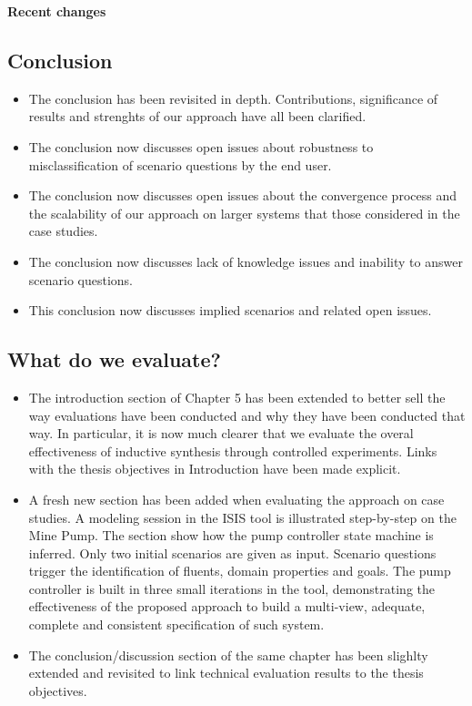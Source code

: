 \begin{center}
\textbf{\Large Recent changes}
\end{center}

\subsection*{Conclusion}

\begin{itemize}
\item The conclusion has been revisited in depth. Contributions, significance of 
      results and strenghts of our approach have all been clarified.
\item The conclusion now discusses open issues about robustness to
      misclassification of scenario questions by the end user.
\item The conclusion now discusses open issues about the convergence process and 
      the scalability of our approach on larger systems that those considered in
      the case studies.
\item The conclusion now discusses lack of knowledge issues and inability to 
      answer scenario questions.
\item This conclusion now discusses implied scenarios and related open issues.
\end{itemize}

\subsection*{What do we evaluate?}

\begin{itemize}
\item The introduction section of Chapter 5 has been extended to better sell the 
    way evaluations have been conducted and why they have been conducted that 
    way. In particular, it is now much clearer that we evaluate the overal 
    effectiveness of inductive synthesis through controlled experiments. 
    Links with the thesis objectives in Introduction have been made explicit.
\item A fresh new section has been added when evaluating the approach on case 
    studies. A modeling session in the ISIS tool is illustrated step-by-step on
    the Mine Pump. The section show how the pump controller state machine is 
    inferred. Only two initial scenarios are given as input. Scenario questions
    trigger the identification of fluents, domain properties and goals. The pump
    controller is built in three small iterations in the tool, demonstrating the
    effectiveness of the proposed approach to build a multi-view, adequate, 
    complete and consistent specification of such system.
\item The conclusion/discussion section of the same chapter has been slighlty 
    extended and revisited to link technical evaluation results to the thesis
    objectives.
\end{itemize}

